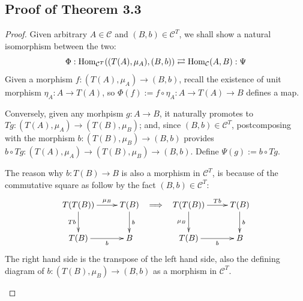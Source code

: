 \documentclass{article}
\begin{document}
\subsection{Proof of Theorem 3.3}\label{thm3_3}
\begin{proof}
    Given arbitrary $A\in\mathcal{C}$ and $(B,b)\in\mathcal{C}^T$, we shall show a natural isomorphism between the two:
    \[\Phi:\mathrm{Hom}_{\mathcal{C}^T}((T(A),\mu_A), (B,b))\rightleftarrows \mathrm{Hom}_\mathcal{C}(A,B):\Psi\]
    Given a morphism $f:(T(A),\mu_A)\rightarrow (B,b)$, recall the existence of unit morphism $\eta_A:A\rightarrow T(A)$, so $\Phi(f):= f\circ \eta_A:A\rightarrow T(A)\rightarrow B$ defines a map. 
    
    Conversely, given any morhpism $g:A\rightarrow B$, it naturally promotes to $Tg:(T(A),\mu_A)\rightarrow (T(B),\mu_B)$; and, since $(B,b)\in\mathcal{C}^T$, postcomposing with the morphism $b:(T(B),\mu_B)\rightarrow (B,b)$ provides $b\circ Tg:(T(A),\mu_A)\rightarrow (T(B),\mu_B)\rightarrow  (B,b)$. Define $\Psi(g):= b\circ Tg$.

    \begin{rem}
        The reason why $b:T(B)\rightarrow B$ is also a morphism in $\mathcal{C}^T$, is because of the commutative square as follow by the fact $(B,b)\in\mathcal{C}^T$:
        \[\xymatrix{
            T(T(B)) \ar[r]^-{\mu_B} \ar[d]_-{Tb} & T(B) \ar[d]^-{b}\\
            T(B) \ar[r]_-{b} & B
        }\ \implies \ \xymatrix{
            T(T(B)) \ar[r]^-{Tb} \ar[d]_-{\mu_B} & T(B) \ar[d]^-{b}\\
            T(B) \ar[r]_-{b} & B
        }\]
        The right hand side is the transpose of the left hand side, also the defining diagram of $b:(T(B),\mu_B)\rightarrow (B,b)$ as a morphism in $\mathcal{C}^T$.
    \end{rem}


\end{proof}
\end{document}
